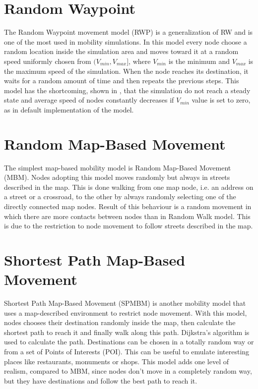 \section{Random Waypoint}
The Random Waypoint movement model (RWP) is a generalization of RW and is one of the most used in mobility simulations. In this model every node choose a random location inside the simulation area and moves toward it at a random speed uniformly chosen from $(V_{min}, V_{max}]$, where $V_{min}$ is the minimum and $V_{max}$ is the maximum speed of the simulation. When the node reaches its destination, it waits for a random amount of time and then repeats the previous steps. This model has the shortcoming, shown in \cite{RWPHarmful}, that the simulation do not reach a steady state and average speed of nodes constantly decreases if $V_{min}$ value is set to zero, as in default implementation of the model. 


\section{Random Map-Based Movement}
The simplest map-based mobility model is Random Map-Based Movement (MBM). Nodes adopting this model moves randomly but always in streets described in the map. This is done walking from one map node, i.e. an address on a street or a crossroad, to the other by always randomly selecting one of the directly connected map nodes. Result of this behaviour is a random movement in which there are more contacts between nodes than in Random Walk model. This is due to the restriction to node movement to follow streets described in the map.


\section{Shortest Path Map-Based Movement}
Shortest Path Map-Based Movement (SPMBM) is another mobility model that uses a map-described environment to restrict node movement. With this model, nodes chooses their destination randomly inside the map, then calculate the shortest path to reach it and finally walk along this path. Dijkstra's algorithm is used to calculate the path. Destinations can be chosen in a totally random way or from a set of Points of Interests (POI). This can be useful to emulate interesting places like restaurants, monuments or shops. This model adds one level of realism, compared to MBM, since nodes don't move in a completely random way, but they have destinations and follow the best path to reach it.


